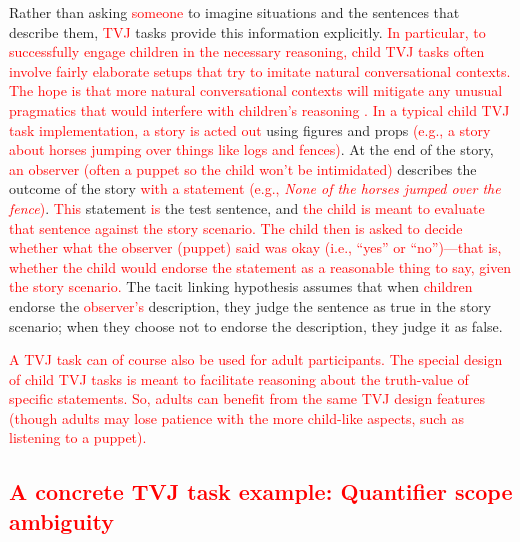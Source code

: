 \documentclass[preprint,authoryear]{elsarticle}\frenchspacing
\newcommand{\lp}[1]{\textcolor{red}{#1}} %
\begin{document}
Rather than asking \lp{someone} to imagine situations and the sentences that describe them, 
\lp{TVJ}
tasks provide this information explicitly.
\lp{In particular, to successfully engage children in the necessary reasoning, child TVJ tasks often involve fairly elaborate setups that try to imitate natural conversational contexts. The hope is that more natural conversational contexts will  
mitigate any unusual pragmatics that would interfere with children's reasoning
\citep{crainmckee1985,crainthornton1998}.}
\lp{In a typical child TVJ task implementation,}
\lp{a story is acted out}
using figures and props
\lp{(e.g., a story about horses jumping over things like logs and fences)}. At the end of the story, 
\lp{an observer (often a puppet so the child won't be intimidated)}
describes the outcome of the story 
\lp{with a statement}
\lp{(e.g., \textit{None of the horses jumped over the fence})}. 
\lp{This}
statement 
\lp{is}
the test sentence, and 
\lp{the child is meant to evaluate that sentence against the story scenario.}
\lp{The child then is asked to decide whether what the observer (puppet) said was okay (i.e., ``yes'' or ``no'')---that is, whether the child would endorse the statement as a reasonable thing to say, given the story scenario.}
The tacit linking hypothesis assumes that when 
\lp{children}
endorse the 
\lp{observer's}
description, they judge the sentence as true in the story scenario; 
when they choose not to endorse the description, they judge it as false.

\lp{A TVJ task can of course also be used for adult participants. The special design of child TVJ tasks is meant to facilitate reasoning about the truth-value of specific statements. So, adults can benefit from the same TVJ design features (though adults may lose patience with the more child-like aspects, such as listening to a puppet). }



\subsection{\lp{A concrete TVJ task example: Quantifier scope ambiguity}}
\end{document}
